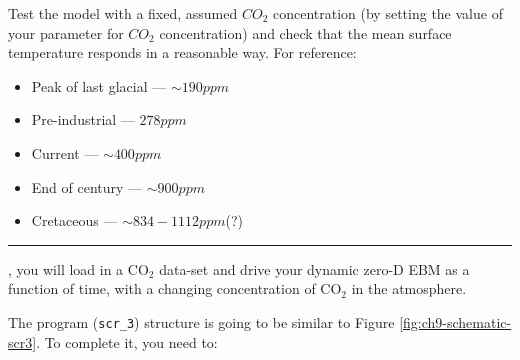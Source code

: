\documentclass{tufte-book} %
\begin{document}
Test the model  with a fixed, assumed \(CO_{2}\) concentration (by setting the value of your parameter for \(CO_{2}\) concentration) and check that the mean surface temperature responds in a reasonable way. For reference:
\begin{itemize}[noitemsep]
\setlength{\itemindent}{.2in}
\item Peak of last glacial --- \(\sim190 ppm\)
\item Pre-industrial --- \(278 ppm\)
\item Current --- \(\sim400 ppm\)
\item End of century --- \(\sim900 ppm\)
\item Cretaceous --- \(\sim 834-1112ppm\)(?)
\end{itemize}

\vspace{1mm}
\noindent\rule{4cm}{0.5pt}
\vspace{-2mm}

, you will load in a CO\(_{2}\) data-set and drive your dynamic zero-D EBM as a function of time, with a changing concentration of CO\(_{2}\) in the atmosphere.

The program (\texttt{scr\_3}) structure is going to be similar to Figure \ref{fig:ch9-schematic-scr3}. To complete it, you need to:  
\end{document}
